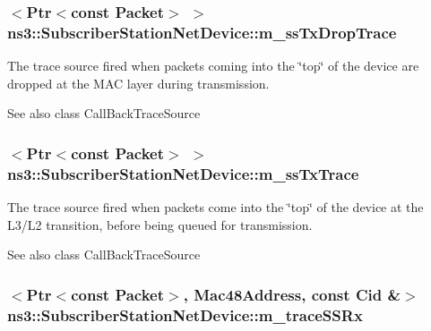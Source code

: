 \subsubsection[{\texorpdfstring{m\+\_\+ss\+Tx\+Drop\+Trace}{m_ssTxDropTrace}}]{$<${\bf Ptr}$<$const {\bf Packet}$>$ $>$ ns3\+::\+Subscriber\+Station\+Net\+Device\+::m\+\_\+ss\+Tx\+Drop\+Trace\hspace{0.3cm}{\ttfamily [private]}}\hypertarget{classns3_1_1SubscriberStationNetDevice_a8eb77ccf96f4d45b40bc9498be58df47}{}\label{classns3_1_1SubscriberStationNetDevice_a8eb77ccf96f4d45b40bc9498be58df47}
The trace source fired when packets coming into the \char`\"{}top\char`\"{} of the device are dropped at the M\+AC layer during transmission.

\begin{DoxySeeAlso}{See also}
class Call\+Back\+Trace\+Source 
\end{DoxySeeAlso}
\subsubsection[{\texorpdfstring{m\+\_\+ss\+Tx\+Trace}{m_ssTxTrace}}]{$<${\bf Ptr}$<$const {\bf Packet}$>$ $>$ ns3\+::\+Subscriber\+Station\+Net\+Device\+::m\+\_\+ss\+Tx\+Trace\hspace{0.3cm}{\ttfamily [private]}}\hypertarget{classns3_1_1SubscriberStationNetDevice_ae35c70c971bddab696265db0c4f85331}{}\label{classns3_1_1SubscriberStationNetDevice_ae35c70c971bddab696265db0c4f85331}
The trace source fired when packets come into the \char`\"{}top\char`\"{} of the device at the L3/\+L2 transition, before being queued for transmission.

\begin{DoxySeeAlso}{See also}
class Call\+Back\+Trace\+Source 
\end{DoxySeeAlso}
\subsubsection[{\texorpdfstring{m\+\_\+trace\+S\+S\+Rx}{m_traceSSRx}}]{$<${\bf Ptr}$<$const {\bf Packet}$>$, {\bf Mac48\+Address}, const {\bf Cid} \&$>$ ns3\+::\+Subscriber\+Station\+Net\+Device\+::m\+\_\+trace\+S\+S\+Rx\hspace{0.3cm}{\ttfamily [private]}}\hypertarget{classns3_1_1SubscriberStationNetDevice_aa1771f784eeb694c5ad2035f97ee52e5}{}\label{classns3_1_1SubscriberStationNetDevice_aa1771f784eeb694c5ad2035f97ee52e5}


